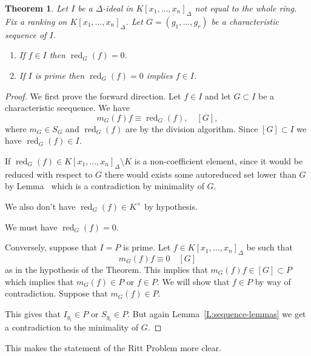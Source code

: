 \documentclass[12pt]{book}
\numberwithin{equation}{section}
\newtheorem{theorem}{Theorem}[subsection]
\theoremstyle{definition}
\theoremstyle{remark}
\newcommand{\red}{\operatorname{red}}
\begin{document}
\begin{theorem}
	Let $I$ be a $\Delta$-ideal in $K[x_1,\ldots,x_n]_{\Delta}$ not equal to the whole ring. 
	Fix a ranking on $K[x_1,\ldots,x_n]_{\Delta}$.
	Let $G=(g_1,\ldots,g_r)$ be a characteristic sequence of $I$. 
	\begin{enumerate}[topsep=0pt]
		\item If $f\in I$ then $\red_G(f)=0$. 
		\item If $I$ is prime then $\red_G(f)=0$ implies $f\in I$. 
	\end{enumerate}
\end{theorem}
\begin{proof}
	We first prove the forward direction. 
	Let $f \in I$ and let $G \subset I$ be a characteristic seequence. 
	We have 
	 $$m_G(f) f \equiv \red_G(f), \quad [G], $$
	where $m_G \in S_G$ and $\red_G(f)$ are by the division algorithm.
	Since $[G] \subset I$ we have $\red_G(f) \in I$.
	
	If $\red_G(f) \in K[x_1,\ldots,x_n]_{\Delta}\setminus K$ is a non-coefficient element, since it would be reduced with respect to $G$ there would exists some autoreduced set lower than $G$ by Lemma~\label{L:reduced-gives-lower} which is a contradiction by minimality of $G$. 

	We also don't have $\red_G(f) \in K^{\times}$ by hypothesis. 
	
	We must have $\red_G(f)=0$. 
	
	Conversely, suppose that $I=P$ is prime. 
	Let $f \in K[x_1,\ldots,x_n]_{\Delta}$ be such that 
	 $$ m_G(f) f \equiv 0 \quad [G] $$
	as in the hypothesis of the Theorem.
	This implies that $m_G(f) f \in [G] \subset P$ which implies that $m_G(f)\in P$ or $f \in P$.
	We will show that $f\in P$ by way of contradiction.
	Suppose that $m_G(f) \in P$.
	
	This gives that $I_{g_i} \in P$ or $S_{g_i} \in P$.
	But again Lemma~\ref{L:sequence-lemmas} we get a contradiction to the minimality of $G$. 
\end{proof}

This makes the statement of the Ritt Problem more clear. 
\end{document}
